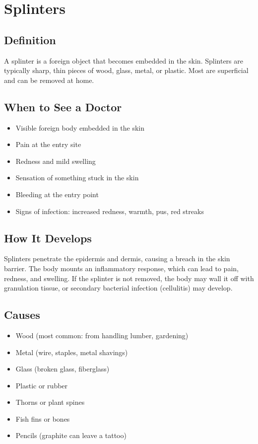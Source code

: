 \chapter{Splinters}

\section*{Definition}
A splinter is a foreign object that becomes embedded in the skin. Splinters are typically sharp, thin pieces of wood, glass, metal, or plastic. Most are superficial and can be removed at home.

\section*{When to See a Doctor}
\begin{itemize}
\item Visible foreign body embedded in the skin
\item Pain at the entry site
\item Redness and mild swelling
\item Sensation of something stuck in the skin
\item Bleeding at the entry point
\item Signs of infection: increased redness, warmth, pus, red streaks
\end{itemize}

\section*{How It Develops}
Splinters penetrate the epidermis and dermis, causing a breach in the skin barrier. The body mounts an inflammatory response, which can lead to pain, redness, and swelling. If the splinter is not removed, the body may wall it off with granulation tissue, or secondary bacterial infection (cellulitis) may develop.

\section*{Causes}
\begin{itemize}
\item Wood (most common: from handling lumber, gardening)
\item Metal (wire, staples, metal shavings)
\item Glass (broken glass, fiberglass)
\item Plastic or rubber
\item Thorns or plant spines
\item Fish fins or bones
\item Pencils (graphite can leave a tattoo)
\end{itemize}

